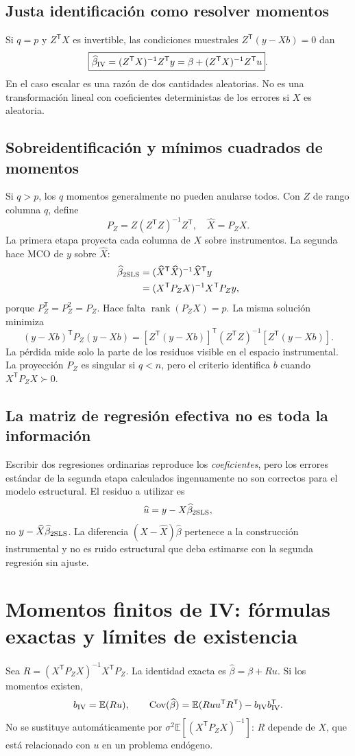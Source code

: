 \documentclass[11pt,a4paper]{article}
\newcommand{\E}{\mathbb E}
\newcommand{\T}{^{\mathsf T}}
\DeclareMathOperator{\Cov}{Cov}
\DeclareMathOperator{\rank}{rank}
\theoremstyle{definition}
\begin{document}
\subsection{Justa identificación como resolver momentos}
Si $q=p$ y $Z\T X$ es invertible, las condiciones muestrales $Z\T(y-Xb)=0$ dan
\[
\boxed{\widehat\beta_{\rm IV}=(Z\T X)^{-1}Z\T y
=\beta+(Z\T X)^{-1}Z\T u}.
\]
En el caso escalar es una razón de dos cantidades aleatorias. No es una transformación lineal con coeficientes deterministas de los errores si $X$ es aleatoria.
\subsection{Sobreidentificación y mínimos cuadrados de momentos}
Si $q>p$, los $q$ momentos generalmente no pueden anularse todos. Con $Z$ de rango columna $q$, define
\[
P_Z=Z(Z\T Z)^{-1}Z\T,
\quad\widehat X=P_ZX.
\]
La primera etapa proyecta cada columna de $X$ sobre instrumentos. La segunda hace MCO de $y$ sobre $\widehat X$:
\begin{align*}
\widehat\beta_{\rm 2SLS}
&=(\widehat X\T\widehat X)^{-1}\widehat X\T y\\
&=(X\T P_ZX)^{-1}X\T P_Zy,
\end{align*}
porque $P_Z\T=P_Z^2=P_Z$. Hace falta $\rank(P_ZX)=p$. La misma solución minimiza
\[
(y-Xb)\T P_Z(y-Xb)
=[Z\T(y-Xb)]\T(Z\T Z)^{-1}[Z\T(y-Xb)].
\]
La pérdida mide solo la parte de los residuos visible en el espacio instrumental. La proyección $P_Z$ es singular si $q<n$, pero el criterio identifica $b$ cuando $X\T P_ZX\succ0$.
\subsection{La matriz de regresión efectiva no es toda la información}
Escribir dos regresiones ordinarias reproduce los \emph{coeficientes}, pero los errores estándar de la segunda etapa calculados ingenuamente no son correctos para el modelo estructural. El residuo a utilizar es
\[
\widehat u=y-X\widehat\beta_{\rm 2SLS},
\]
no $y-\widehat X\widehat\beta_{\rm 2SLS}$. La diferencia $(X-\widehat X)\widehat\beta$ pertenece a la construcción instrumental y no es ruido estructural que deba estimarse con la segunda regresión sin ajuste.

\section{Momentos finitos de IV: fórmulas exactas y límites de existencia}
Sea $R=(X\T P_ZX)^{-1}X\T P_Z$. La identidad exacta es $\widehat\beta=\beta+Ru$. Si los momentos existen,
\[
b_{\rm IV}=\E(Ru),\qquad
\Cov(\widehat\beta)=\E(Ruu\T R\T)-b_{\rm IV}b_{\rm IV}\T.
\]
No se sustituye automáticamente por $\sigma^2\E[(X\T P_ZX)^{-1}]$: $R$ depende de $X$, que está relacionado con $u$ en un problema endógeno.
\end{document}

